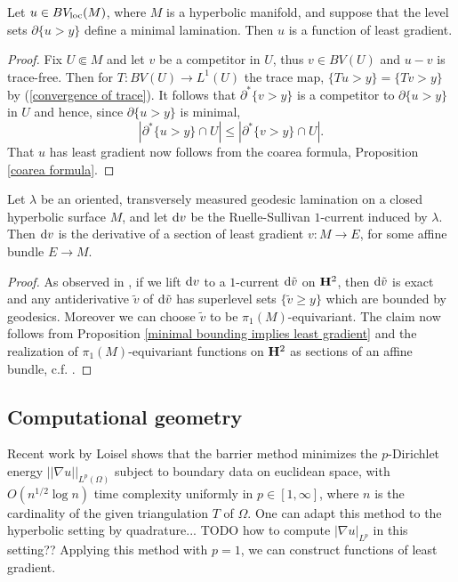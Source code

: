 \begin{proposition}\label{minimal bounding implies least gradient}
Let $u \in BV_{\mathrm{loc}}(M)$, where $M$ is a hyperbolic manifold, and suppose that the level sets $\partial \{u > y\}$ define a minimal lamination.
Then $u$ is a function of least gradient.
\end{proposition}
\begin{proof}
Fix $U \Subset M$ and let $v$ be a competitor in $U$, thus $v \in BV(U)$ and $u - v$ is trace-free.
Then for $T: BV(U) \to L^1(U)$ the trace map, $\{Tu > y\} = \{Tv > y\}$ by (\ref{convergence of trace}).
It follows that $\partial^* \{v > y\}$ is a competitor to $\partial \{u > y\}$ in $U$ and hence, since $\partial \{u > y\}$ is minimal,
$$|\partial^* \{u > y\} \cap U| \leq |\partial^* \{v > y\} \cap U|.$$
That $u$ has least gradient now follows from the coarea formula, Proposition \ref{coarea formula}.
\end{proof}

\begin{corollary}\label{ruelle sullivan antiderivative}
Let $\lambda$ be an oriented, transversely measured geodesic lamination on a closed hyperbolic surface $M$, and let $\mathop{}\!\mathrm{d} v$ be the Ruelle-Sullivan $1$-current induced by $\lambda$.
Then $\mathop{}\!\mathrm{d} v$ is the derivative of a section of least gradient $v: M \to E$, for some affine bundle $E \to M$.
\end{corollary}
\begin{proof}
As observed in \cite[\S9]{daskalopoulos2020transverse}, if we lift $\mathop{}\!\mathrm{d} v$ to a $1$-current $\mathop{}\!\mathrm{d} \tilde v$ on $\mathbf H^2$, then $\mathop{}\!\mathrm{d} \tilde v$ is exact and any antiderivative $\tilde v$ of $\mathop{}\!\mathrm{d} \tilde v$ has superlevel sets $\{\tilde v \geq y\}$ which are bounded by geodesics.
Moreover we can choose $\tilde v$ to be $\pi_1(M)$-equivariant.
The claim now follows from Proposition \ref{minimal bounding implies least gradient} and the realization of $\pi_1(M)$-equivariant functions on $\mathbf H^2$ as sections of an affine bundle, c.f. \cite[\S4]{daskalopoulos2020transverse}.
\end{proof}


\subsection{Computational geometry}
Recent work by Loisel \cite{Loisel20} shows that the barrier method minimizes the $p$-Dirichlet energy $||\nabla u||_{L^p(\Omega)}$
subject to boundary data on euclidean space, with $O(n^{1/2} \log n)$ time complexity uniformly in $p \in [1, \infty]$, where $n$ is the cardinality of the given triangulation $T$ of $\Omega$.
One can adapt this method to the hyperbolic setting by quadrature... TODO how to compute $|\nabla u|_{L^p}$ in this setting??
Applying this method with $p = 1$, we can construct functions of least gradient.

